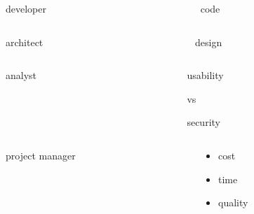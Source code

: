\begin{frame}
\begin{columns}
\begin{column}{0.5\linewidth}
developer
\end{column}
\begin{column}{0.5\linewidth}
code
\end{column}
\end{columns}
\end{frame}

\begin{frame}
\begin{columns}
\begin{column}{0.5\linewidth}
architect
\end{column}
\begin{column}{0.5\linewidth}
design
\end{column}
\end{columns}
\end{frame}

\begin{frame}
\begin{columns}
\begin{column}{0.5\linewidth}
analyst
\end{column}
\begin{column}{0.5\linewidth}
\begin{center}
usability

vs

security
\end{center}
\end{column}
\end{columns}
\end{frame}

\begin{frame}
\begin{columns}
\begin{column}{0.4\linewidth}
project manager
\end{column}
\begin{column}{0.4\linewidth}
\begin{itemize}
	\item cost
	\item time
	\item quality
\end{itemize}
\end{column}
\end{columns}
\end{frame}

